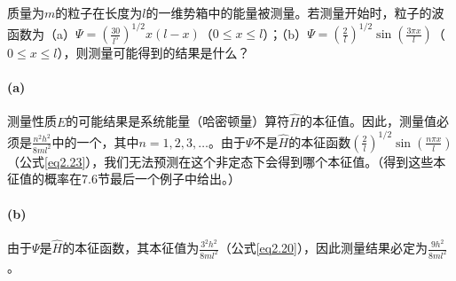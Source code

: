 \documentclass[12pt,a4paper,openany]{ctexbook}
\begin{document}
\begin{flushleft}
\begin{examplebox}
质量为\(m\)的粒子在长度为\(l\)的一维势箱中的能量被测量。若测量开始时，粒子的波函数为（a）\(\Psi = \left(\frac{30}{l^5}\right)^{1/2}x(l - x)\)（\(0 \leq x \leq l\)）；（b）\(\Psi = \left(\frac{2}{l}\right)^{1/2}\sin\left(\frac{3\pi x}{l}\right)\)（\(0 \leq x \leq l\)），则测量可能得到的结果是什么？

\paragraph{(a)} 测量性质\(E\)的可能结果是系统能量（哈密顿量）算符\(\hat{H}\)的本征值。因此，测量值必须是\(\frac{n^2h^2}{8ml^2}\)中的一个，其中\(n = 1, 2, 3, \dots\)。由于\(\Psi\)不是\(\hat{H}\)的本征函数\(\left(\frac{2}{l}\right)^{1/2}\sin\left(\frac{n\pi x}{l}\right)\)（公式\eqref{eq2.23}），我们无法预测在这个非定态下会得到哪个本征值。（得到这些本征值的概率在7.6节最后一个例子中给出。）

\paragraph{(b)} 由于\(\Psi\)是\(\hat{H}\)的本征函数，其本征值为\(\frac{3^2h^2}{8ml^2}\)（公式\eqref{eq2.20}），因此测量结果必定为\(\frac{9h^2}{8ml^2}\)。
\end{examplebox}
\end{flushleft}
\end{document}
